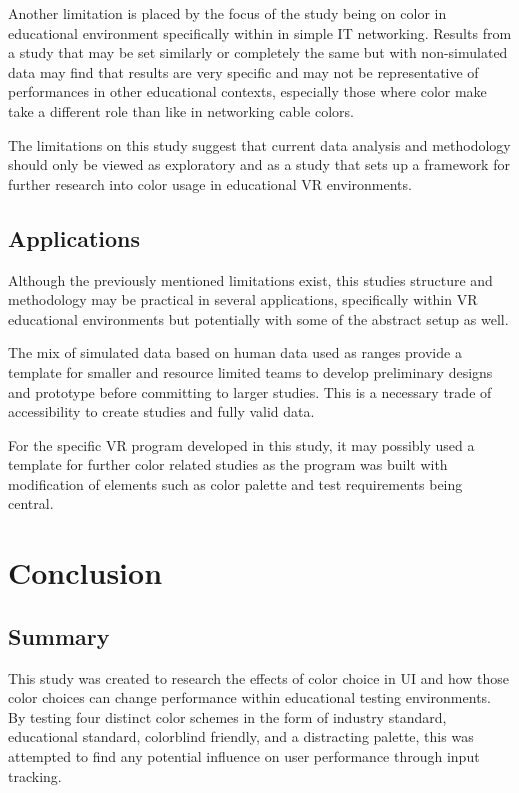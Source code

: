 \documentclass[acmlarge]{acmart}
\begin{document}
Another limitation is placed by the focus of the study being on color in educational environment specifically within in simple IT networking. Results from a study that may be set similarly or completely the same but with non-simulated data may find that results are very specific and may not be representative of performances in other educational contexts, especially those where color make take a different role than like in networking cable colors.

The limitations on this study suggest that current data analysis and methodology should only be viewed as exploratory and as a study that sets up a framework for further research into color usage in educational VR environments.

\subsection{Applications}
Although the previously mentioned limitations exist, this studies structure and methodology may be practical in several applications, specifically within VR educational environments but potentially with some of the abstract setup as well.

The mix of simulated data based on human data used as ranges provide a template for smaller and resource limited teams to develop preliminary designs and prototype before committing to larger studies. This is a necessary trade of accessibility to create studies and fully valid data.

For the specific VR program developed in this study, it may possibly used a template for further color related studies as the program was built with modification of elements such as color palette and test requirements being central.

\section{Conclusion}
\subsection{Summary}
This study was created to research the effects of color choice in UI and how those color choices can change performance within educational testing environments. By testing four distinct color schemes in the form of industry standard, educational standard, colorblind friendly, and a distracting palette, this was attempted to find any potential influence on user performance through input tracking.
\end{document}
